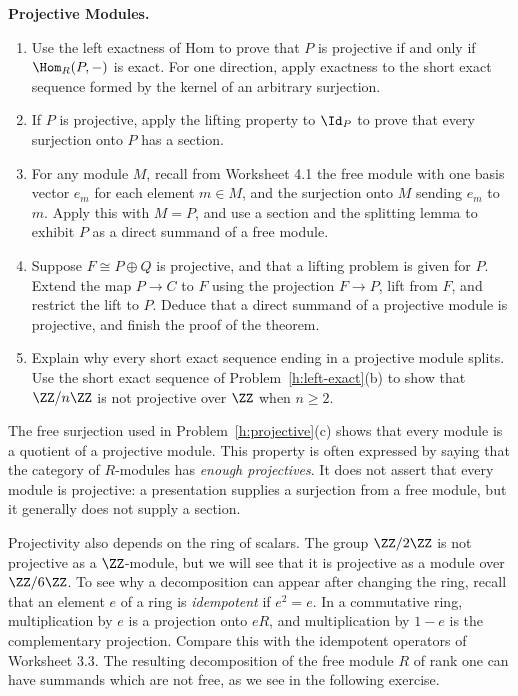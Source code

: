 \documentclass[12pt,reqno]{amsart}
\begin{document}
\begin{problems}
\item\label{h:projective} \textbf{Projective Modules.}
\begin{enumerate}
\item Use the left exactness of Hom to prove that $P$ is projective if and only if $\Hom_R(P,-)$ is exact. For one direction, apply exactness to the short exact sequence formed by the kernel of an arbitrary surjection.
\item If $P$ is projective, apply the lifting property to $\Id_P$ to prove that every surjection onto $P$ has a section.
\item For any module $M$, recall from Worksheet 4.1 the free module with one basis vector $e_m$ for each element $m\in M$, and the surjection onto $M$ sending $e_m$ to $m$. Apply this with $M=P$, and use a section and the splitting lemma to exhibit $P$ as a direct summand of a free module.
\item Suppose $F\cong P\oplus Q$ is projective, and that a lifting problem is given for $P$. Extend the map $P\to C$ to $F$ using the projection $F\to P$, lift from $F$, and restrict the lift to $P$. Deduce that a direct summand of a projective module is projective, and finish the proof of the theorem.
\item Explain why every short exact sequence ending in a projective module splits. Use the short exact sequence of Problem~\ref{h:left-exact}(b) to show that $\ZZ/n\ZZ$ is not projective over $\ZZ$ when $n\geq2$.
\end{enumerate}
\end{problems}

\hrulefill

The free surjection used in Problem~\ref{h:projective}(c) shows that every module is a quotient of a projective module. This property is often expressed by saying that the category of $R$-modules has \emph{enough projectives}. It does not assert that every module is projective: a presentation supplies a surjection from a free module, but it generally does not supply a section.

Projectivity also depends on the ring of scalars. The group $\ZZ/2\ZZ$ is not projective as a $\ZZ$-module, but we will see that it is projective as a module over $\ZZ/6\ZZ$. To see why a decomposition can appear after changing the ring, recall that an element $e$ of a ring is \emph{idempotent} if $e^2=e$. In a commutative ring, multiplication by $e$ is a projection onto $eR$, and multiplication by $1-e$ is the complementary projection. Compare this with the idempotent operators of Worksheet 3.3. The resulting decomposition of the free module $R$ of rank one can have summands which are not free, as we see in the following exercise.
\end{document}
